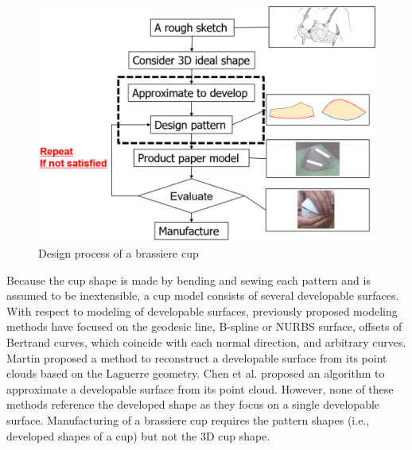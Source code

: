 \documentclass[E]{scitrans}
\begin{document}
\begin{figure}[h!]
	\centering
	\includegraphics[width= 1.0 \columnwidth]{./figure/DesignProcess2.eps}
	\caption{Design process of a brassiere cup}
	\label{fig:process}
\end{figure}

Because the cup shape is made by bending and sewing each pattern and is assumed to be inextensible, a cup model consists of several developable surfaces. With respect to modeling of developable surfaces, previously proposed modeling methods have focused on the geodesic line\cite{c2}, B-spline or NURBS surface\cite{c3,c4}, offsets of Bertrand curves, which coincide with each normal direction\cite{c5,c6}, and arbitrary curves\cite{c7}. Martin proposed a method to reconstruct a developable surface from its point clouds based on the Laguerre geometry\cite{c8}. Chen et al. proposed an algorithm to approximate a developable surface from its point cloud\cite{c9}. However, none of these methods reference the developed shape as they focus on a single developable surface. Manufacturing of a brassiere cup requires the pattern shapes (i.e., developed shapes of a cup) but not the 3D cup shape.
\end{document}

